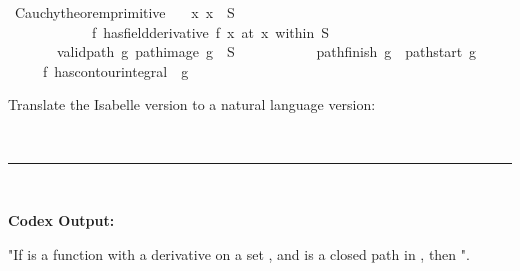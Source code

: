 \documentclass{article}
\begin{document}
\begin{boxB}
\begin{isabelle}
\isamarkupfalse \ Cauchy{\isacharunderscore}{\kern0pt}theorem{\isacharunderscore}{\kern0pt}primitive{\isacharcolon}{\kern0pt}\isanewline
\ \ \ {\isachardoublequoteopen}{\isasymAnd}x{\isachardot}{\kern0pt}\ x\ {\isasymin}\ S\ {\isasymLongrightarrow}\ \isanewline
\ \ \ \ \ \ \ \ \ \ \ \ {\isacharparenleft}{\kern0pt}f\ has{\isacharunderscore}{\kern0pt}field{\isacharunderscore}{\kern0pt}derivative\ f{\isacharprime}{\kern0pt}\ x{\isacharparenright}{\kern0pt}\ {\isacharparenleft}{\kern0pt}at\ x\ within\ S{\isacharparenright}{\kern0pt}{\isachardoublequoteclose}\isanewline
\ \ \ \ \ \ \ {\isachardoublequoteopen}valid{\isacharunderscore}{\kern0pt}path\ g{\isachardoublequoteclose}\ {\isachardoublequoteopen}path{\isacharunderscore}{\kern0pt}image\ g\ {\isasymsubseteq}\ S{\isachardoublequoteclose}\ \isanewline
\ \ \ \ \ \ \ \ \ \ {\isachardoublequoteopen}pathfinish\ g\ {\isacharequal}{\kern0pt}\ pathstart\ g{\isachardoublequoteclose}\isanewline
\ \ \ \ \ {\isachardoublequoteopen}{\isacharparenleft}{\kern0pt}f{\isacharprime}{\kern0pt}\ has{\isacharunderscore}{\kern0pt}contour{\isacharunderscore}{\kern0pt}integral\ {}{\isacharparenright}{\kern0pt}\ g{\isachardoublequoteclose}
\end{isabelle}
Translate the Isabelle version to a natural language version:

\
\hrule
\

\textbf{Codex Output:}

"If  is a function with a derivative  on a set , and  is a closed path in , then ".
\end{boxB}
\end{document}
